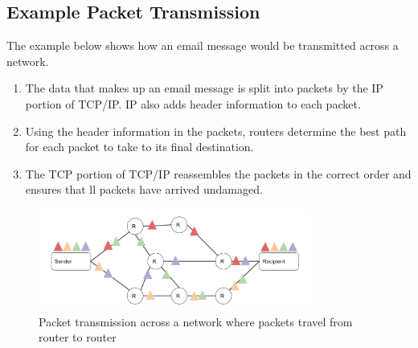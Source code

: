 \subsection*{Example Packet Transmission}
The example below shows how an email message would be transmitted across a network. 
\begin{enumerate}
    \item The data that makes up an email message is split into packets by the IP portion of TCP/IP. IP also adds header information to each packet.
    \item Using the header information in the packets, routers determine the best path for each packet to take to its final destination.
    \item The TCP portion of TCP/IP reassembles the packets in the correct order and ensures that ll packets have arrived undamaged.
\end{enumerate}
\begin{figure}[H]
    \centering
    \includegraphics*[width=0.8\textwidth]{assets/packet-transmission.png}
    \caption{Packet transmission across a network where packets travel from router to router}
\end{figure}